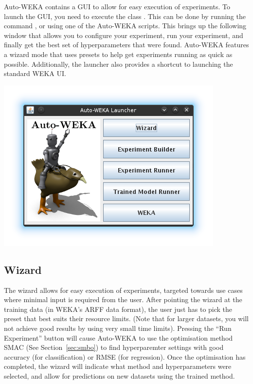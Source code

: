 Auto-WEKA contains a GUI to allow for easy execution of experiments. To launch the GUI, you need to execute the class . This can be done by running the command , or using one of the Auto-WEKA scripts. This brings up the following window that allows you to configure your experiment, run your experiment, and finally get the best set of hyperparameters that were found. Auto-WEKA features a wizard mode that uses presets to help get experiments running as quick as possible. Additionally, the launcher also provides a shortcut to launching the standard WEKA UI.

\begin{center}
  \includegraphics[scale=0.75]{guiscreens/launcher.png}
\end{center}


\subsection{Wizard}

The wizard allows for easy execution of experiments, targeted towards use cases where minimal input is required from the user. After pointing the wizard at the training data (in WEKA's ARFF data format), the user just has to pick the preset that best suits their resource limits. (Note that for larger datasets,  you will not achieve good results by using very small time limits). Pressing the ``Run Experiment'' button will cause Auto-WEKA to use the optimisation method SMAC (See Section~\ref{sec:smbo}) to find hyperparemter settings with good accuracy (for classification) or RMSE (for regression). Once the optimisation has completed, the wizard will indicate what method and hyperparameters were selected, and allow for predictions on new datasets using the trained method.

